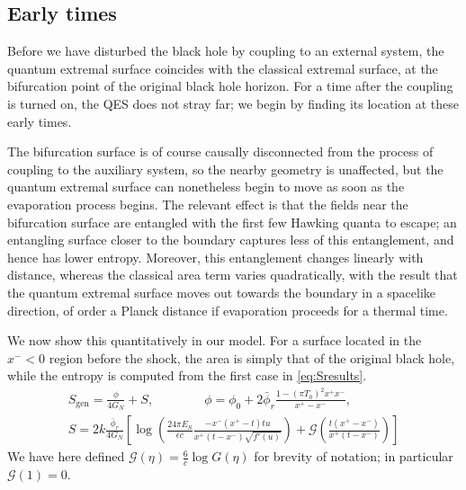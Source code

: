 \documentclass[12pt]{article}
\begin{document}
\subsection{Early times}\label{sec:earlyQES}

Before we have disturbed the black hole by coupling to an external system, the quantum extremal surface coincides with the classical extremal surface, at the bifurcation point of the original black hole horizon. For a time after the coupling is turned on, the QES does not stray far; we begin by finding its location at these early times.

The bifurcation surface is of course causally disconnected from the process of coupling to the auxiliary system, so the nearby geometry is unaffected, but the quantum extremal surface can nonetheless begin to move as soon as the evaporation process begins. The relevant effect is that the fields near the bifurcation surface are entangled with the first few Hawking quanta to escape; an entangling surface closer to the boundary captures less of this entanglement, and hence has lower entropy. Moreover, this entanglement changes linearly with distance, whereas the classical area term varies quadratically, with the result that the quantum extremal surface moves out towards the boundary in a spacelike direction, of order a Planck distance if evaporation proceeds for a thermal time.

We now show this quantitatively in our model. For a surface located in the $x^-<0$ region before the shock, the area is simply that of the original black hole, while the entropy is computed from the first case in \eqref{eq:Sresults}.
\begin{equation}
\begin{gathered}
	 S_\text{gen} = \frac{\phi}{4G_N} + S, \qquad\qquad  \phi = \phi_0 + 2\bar{\phi}_r\frac{1-(\pi T_0)^2x^+x^-}{x^+-x^-},  \\
 S= 2k\frac{\bar{\phi}_r}{4G_N} \left[ \log\left(\frac{24\pi E_S}{\epsilon c}  \frac{-x^-(x^+ -t) t u}{x^+(t-x^-)\sqrt{f'(u)}}\right)+ \mathcal{G}\left(\frac{t(x^+-x^-)}{x^+(t-x^-)}\right) \right]
\end{gathered}
\end{equation}
We have here defined $\mathcal{G}(\eta) = \frac{6}{c} \log G(\eta)$ for brevity of notation; in particular $\mathcal{G}(1)=0$.
\end{document}
